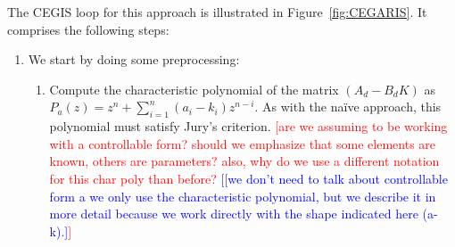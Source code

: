 \documentclass[twocolumn]{autart}    %
\newcommand{\mat}[1]{{#1}}
\renewcommand{\note}[1]{\textcolor{red}{[#1]}}
\newcommand{\reply}[1]{\textcolor{blue}{[#1]}}
\begin{document}
The CEGIS loop for this approach is illustrated in Figure~\ref{fig:CEGARIS}. 
%
It comprises the following steps:  
\begin{enumerate}
\item 
  We start by doing some preprocessing:%
  \begin{enumerate}
\item Compute the characteristic polynomial of the matrix $(A_d-B_dK)$ as 
$P_a(z) = z^n+\sum_{i=1}^n{(a_i-k_i)z^{n-i}}$.  As with the na\"ive approach, this polynomial must satisfy Jury's criterion.
\note{are we assuming to be working with a controllable form? should we emphasize that some elements are known, others are parameters? also, why do we use a different notation for this char poly than before?
\reply{[we don't need to talk about controllable form a we only use the characteristic polynomial, but we describe it in more detail because we work directly with the shape indicated here (a-k).}}   


\end{enumerate}
\end{enumerate}
\end{document}
